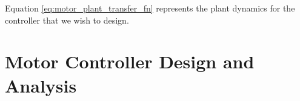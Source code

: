 \documentclass{report}
\begin{document}
Equation \ref{eq:motor_plant_transfer_fn} represents the plant dynamics for the controller that we wish to design.

\section{Motor Controller Design and Analysis}

\begin{center}
\end{center}

 

\end{document}

